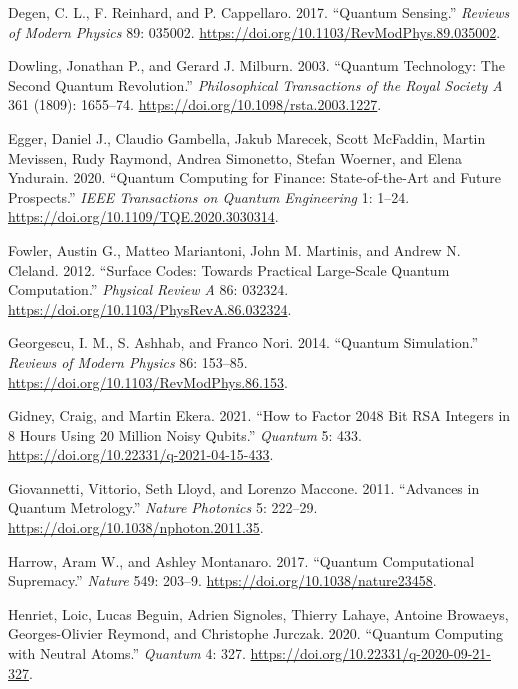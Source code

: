 \documentclass[
  11pt,
  letterpaper,
]{article}
\newlength{\cslhangindent}
\newenvironment{CSLReferences}[2] %
 {\begin{list}{}{%
  \setlength{\itemindent}{0pt}
  \setlength{\leftmargin}{0pt}
  \setlength{\parsep}{0pt}
  \ifodd #1
   \setlength{\leftmargin}{\cslhangindent}
   \setlength{\itemindent}{-1\cslhangindent}
  \fi
  \setlength{\itemsep}{#2\baselineskip}}}
 {\end{list}}
\begin{document}
\begin{CSLReferences}{1}{0}
Degen, C. L., F. Reinhard, and P. Cappellaro. 2017. {``Quantum
Sensing.''} \emph{Reviews of Modern Physics} 89: 035002.
\url{https://doi.org/10.1103/RevModPhys.89.035002}.

Dowling, Jonathan P., and Gerard J. Milburn. 2003. {``Quantum
Technology: The Second Quantum Revolution.''} \emph{Philosophical
Transactions of the Royal Society A} 361 (1809): 1655--74.
\url{https://doi.org/10.1098/rsta.2003.1227}.

Egger, Daniel J., Claudio Gambella, Jakub Marecek, Scott McFaddin,
Martin Mevissen, Rudy Raymond, Andrea Simonetto, Stefan Woerner, and
Elena Yndurain. 2020. {``Quantum Computing for Finance: State-of-the-Art
and Future Prospects.''} \emph{IEEE Transactions on Quantum Engineering}
1: 1--24. \url{https://doi.org/10.1109/TQE.2020.3030314}.

Fowler, Austin G., Matteo Mariantoni, John M. Martinis, and Andrew N.
Cleland. 2012. {``Surface Codes: Towards Practical Large-Scale Quantum
Computation.''} \emph{Physical Review A} 86: 032324.
\url{https://doi.org/10.1103/PhysRevA.86.032324}.

Georgescu, I. M., S. Ashhab, and Franco Nori. 2014. {``Quantum
Simulation.''} \emph{Reviews of Modern Physics} 86: 153--85.
\url{https://doi.org/10.1103/RevModPhys.86.153}.

Gidney, Craig, and Martin Ekera. 2021. {``How to Factor 2048 Bit RSA
Integers in 8 Hours Using 20 Million Noisy Qubits.''} \emph{Quantum} 5:
433. \url{https://doi.org/10.22331/q-2021-04-15-433}.

Giovannetti, Vittorio, Seth Lloyd, and Lorenzo Maccone. 2011.
{``Advances in Quantum Metrology.''} \emph{Nature Photonics} 5: 222--29.
\url{https://doi.org/10.1038/nphoton.2011.35}.

Harrow, Aram W., and Ashley Montanaro. 2017. {``Quantum Computational
Supremacy.''} \emph{Nature} 549: 203--9.
\url{https://doi.org/10.1038/nature23458}.

Henriet, Loic, Lucas Beguin, Adrien Signoles, Thierry Lahaye, Antoine
Browaeys, Georges-Olivier Reymond, and Christophe Jurczak. 2020.
{``Quantum Computing with Neutral Atoms.''} \emph{Quantum} 4: 327.
\url{https://doi.org/10.22331/q-2020-09-21-327}.


\end{CSLReferences}
\end{document}
